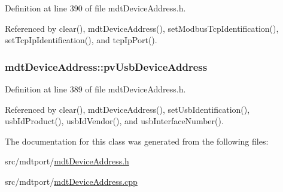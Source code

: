 Definition at line 390 of file mdt\-Device\-Address.\-h.



Referenced by clear(), mdt\-Device\-Address(), set\-Modbus\-Tcp\-Identification(), set\-Tcp\-Ip\-Identification(), and tcp\-Ip\-Port().

\hypertarget{classmdt_device_address_a4a049c594dc631ada14b3697244d4bff}{
\subsubsection[{pv\-Usb\-Device\-Address}]{ mdt\-Device\-Address\-::pv\-Usb\-Device\-Address}}\label{classmdt_device_address_a4a049c594dc631ada14b3697244d4bff}


Definition at line 389 of file mdt\-Device\-Address.\-h.



Referenced by clear(), mdt\-Device\-Address(), set\-Usb\-Identification(), usb\-Id\-Product(), usb\-Id\-Vendor(), and usb\-Interface\-Number().



The documentation for this class was generated from the following files\-:\begin{DoxyCompactItemize}
\item 
src/mdtport/\hyperlink{mdt_device_address_8h}{mdt\-Device\-Address.\-h}\item 
src/mdtport/\hyperlink{mdt_device_address_8cpp}{mdt\-Device\-Address.\-cpp}\end{DoxyCompactItemize}
